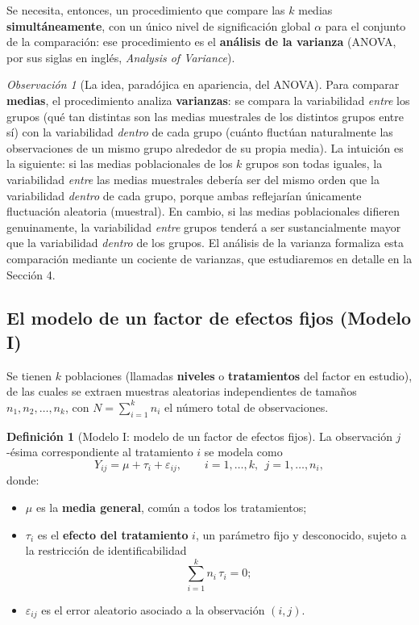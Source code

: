 \documentclass[11pt,a4paper]{article}
\theoremstyle{plain}
\theoremstyle{definition}
\newtheorem{definicion}[teorema]{Definición}
\theoremstyle{remark}
\newtheorem{observacion}[teorema]{Observación}
\begin{document}
Se necesita, entonces, un procedimiento que compare las $k$ medias \textbf{simultáneamente}, con un único nivel de significación global $\alpha$ para el conjunto de la comparación: ese procedimiento es el \textbf{análisis de la varianza} (ANOVA, por sus siglas en inglés, \emph{Analysis of Variance}).

\begin{observacion}[La idea, paradójica en apariencia, del ANOVA]
Para comparar \textbf{medias}, el procedimiento analiza \textbf{varianzas}: se compara la variabilidad \emph{entre} los grupos (qué tan distintas son las medias muestrales de los distintos grupos entre sí) con la variabilidad \emph{dentro} de cada grupo (cuánto fluctúan naturalmente las observaciones de un mismo grupo alrededor de su propia media). La intuición es la siguiente: si las medias poblacionales de los $k$ grupos son todas iguales, la variabilidad \emph{entre} las medias muestrales debería ser del mismo orden que la variabilidad \emph{dentro} de cada grupo, porque ambas reflejarían únicamente fluctuación aleatoria (muestral). En cambio, si las medias poblacionales difieren genuinamente, la variabilidad \emph{entre} grupos tenderá a ser sustancialmente mayor que la variabilidad \emph{dentro} de los grupos. El análisis de la varianza formaliza esta comparación mediante un cociente de varianzas, que estudiaremos en detalle en la Sección 4.
\end{observacion}

\subsection{El modelo de un factor de efectos fijos (Modelo I)}

Se tienen $k$ poblaciones (llamadas \textbf{niveles} o \textbf{tratamientos} del factor en estudio), de las cuales se extraen muestras aleatorias independientes de tamaños $n_1,n_2,\dots,n_k$, con $N=\sum_{i=1}^kn_i$ el número total de observaciones.

\begin{definicion}[Modelo I: modelo de un factor de efectos fijos]
La observación $j$-ésima correspondiente al tratamiento $i$ se modela como
\[
Y_{ij} = \mu+\tau_i+\varepsilon_{ij}, \qquad i=1,\dots,k,\ \ j=1,\dots,n_i,
\]
donde:
\begin{itemize}
\item $\mu$ es la \textbf{media general}, común a todos los tratamientos;
\item $\tau_i$ es el \textbf{efecto del tratamiento} $i$, un parámetro fijo y desconocido, sujeto a la restricción de identificabilidad
\[
\sum_{i=1}^k n_i\,\tau_i = 0;
\]
\item $\varepsilon_{ij}$ es el error aleatorio asociado a la observación $(i,j)$.
\end{itemize}
\end{definicion}
\end{document}
